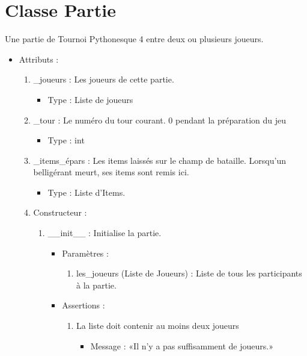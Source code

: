 \documentclass[12pt,pdftex,oneside]{article}
\begin{document}
\begin{itemize}
\begin{enumerate}
    \end{enumerate}
  \end{itemize}


  \section {Classe Partie}

  Une partie de Tournoi Pythonesque 4 entre deux ou plusieurs joueurs.

  \begin{itemize}

  \item Attributs : 
    \begin{enumerate}
    \item \_joueurs : Les joueurs de cette partie.
          \begin{itemize}
          \item Type : Liste de joueurs
          \end{itemize}
    \item \_tour : Le numéro du tour courant. 0 pendant la préparation du jeu
          \begin{itemize}
          \item Type : int
          \end{itemize}
    \item \_items\_épars : Les items laissés sur le champ de bataille. Lorsqu'un
      belligérant meurt, ses items sont remis ici.
          \begin{itemize}
          \item Type : Liste d'Items.
          \end{itemize}

  \item Constructeur : 

  \begin{enumerate}
  \item \_\_init\_\_ : Initialise la partie.
    \begin{itemize}
    \item Paramètres : 
      \begin{enumerate}
      \item les\_joueurs (Liste de Joueurs) : Liste de tous les participants à
        la partie.
      \end{enumerate}
      \item Assertions : 
        \begin{enumerate}
        \item La liste doit contenir au moins deux joueurs
          \begin{itemize}
          \item Message : «Il n'y a pas suffisamment de joueurs.»
          \end{itemize}
        \end{enumerate}
    \end{itemize}


\end{enumerate}
\end{enumerate}
\end{itemize}
\end{document}
